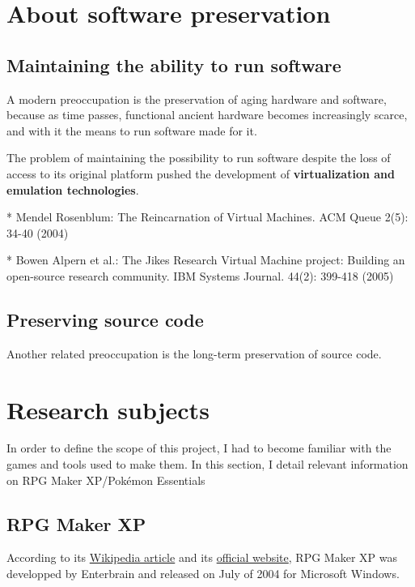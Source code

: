 \documentclass[11pt]{article}
\begin{document}
\section{About software preservation}

\subsection{Maintaining the ability to run software}

A modern preoccupation is the preservation of aging hardware and software, because as time passes, functional ancient hardware becomes increasingly scarce, and with it the means to run software made for it.

The problem of maintaining the possibility to run software despite the loss of access to its original platform pushed the development of \textbf{virtualization and emulation technologies}.

* Mendel Rosenblum: The Reincarnation of Virtual Machines. ACM Queue 2(5): 34-40 (2004)

* Bowen Alpern et al.: The Jikes Research Virtual Machine project: Building an open-source research community. IBM Systems Journal. 44(2): 399-418 (2005)

\subsection{Preserving source code}

Another related preoccupation is the long-term preservation of source code.


\section{Research subjects}

In order to define the scope of this project, I had to become familiar with the games and tools used to make them. In this section, I detail relevant information on RPG Maker XP/Pokémon Essentials

\subsection{RPG Maker XP}


According to its \href{https://en.wikipedia.org/wiki/RPG_Maker#RPG_Maker_series_timeline}{Wikipedia article} and its \href{https://www.rpgmakerweb.com/products/programs/rpg-maker-xp}{official website}, RPG Maker XP was developped by Enterbrain and released on July of 2004 for Microsoft Windows. 
\end{document}

